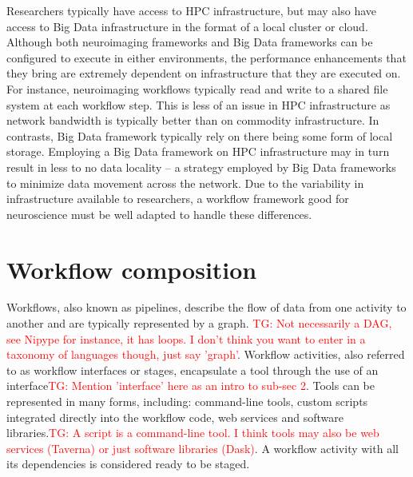 \documentclass{report}
\newcommand{\tristan}[1]{\textcolor{red}{TG: #1}}
\begin{document}
            Researchers typically have access to HPC infrastructure, but may
            also have access to Big Data infrastructure in the format of a 
            local cluster or cloud. Although both neuroimaging frameworks and
            Big Data frameworks can be configured to execute in either 
            environments,
            the performance enhancements that they bring are extremely
            dependent on infrastructure that they are executed on. For instance,
            neuroimaging workflows typically read and write to a shared file
            system at each workflow step. This is less of an issue in HPC 
            infrastructure as network bandwidth is typically better than on 
            commodity infrastructure. In contrasts, Big Data framework typically
            rely on there being some form of local storage. Employing a Big Data
            framework on HPC infrastructure may in turn result in less to no 
            data locality -- a strategy employed by Big Data frameworks to 
            minimize data movement across the network. Due to the variability in
            infrastructure available to researchers, a workflow framework good
            for neuroscience must be well adapted to handle these differences.

    \chapter{Workflow composition}\label{workcomp}

        Workflows, also known as pipelines, describe the flow of data from one 
        activity to another and are typically represented by a graph. \tristan{Not necessarily a DAG, see Nipype for instance, it has loops.
        I don't think you want to enter in a taxonomy of languages though, just say 'graph'}. Workflow activities, also referred to as 
        workflow interfaces or stages, encapsulate a tool through the use of an
        interface\tristan{Mention 'interface' here as an intro to sub-sec 2}. 
        Tools can be represented in many forms, including: command-line tools, 
        custom scripts integrated directly into the workflow code, web 
        services and software libraries.\tristan{A script is a command-line tool. I think tools may also be web services (Taverna) or just 
        software libraries (Dask)}. A workflow activity with all its 
        dependencies is considered ready to be staged.
\end{document}
